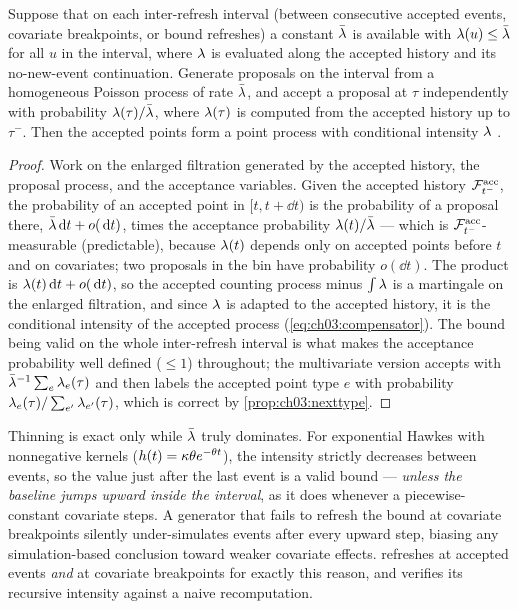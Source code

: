\begin{proposition}\label{prop:ch03:thinning}
Suppose that on each inter-refresh interval (between consecutive accepted
events, covariate breakpoints, or bound refreshes) a constant
$\bar{\lambda}$ is available with $\lambda(u) \le \bar{\lambda}$ for all $u$ in the
interval, where $\lambda$ is evaluated along the accepted history and its
no-new-event continuation. Generate proposals on the interval from a
homogeneous Poisson process of rate $\bar{\lambda}$, and accept a proposal at
$\tau$ independently with probability $\lambda(\tau)/\bar{\lambda}$, where
$\lambda(\tau)$ is computed from the accepted history up to $\tau^-$. Then
the accepted points form a point process with conditional intensity
$\lambda$ \citep{lewisshedler1979,ogata1981}.
\end{proposition}

\begin{proof}
Work on the enlarged filtration generated by the accepted history, the
proposal process, and the acceptance variables. Given the accepted history
$\mathcal{F}^{\mathrm{acc}}_{t^-}$, the probability of an accepted point in
$[t, t+\dd t)$ is the probability of a proposal there,
$\bar{\lambda}\,\mathrm{d} t + o(\,\mathrm{d} t)$, times the acceptance probability
$\lambda(t)/\bar{\lambda}$ --- which is $\mathcal{F}^{\mathrm{acc}}_{t^-}$-measurable
(predictable), because $\lambda(t)$ depends only on accepted points before
$t$ and on covariates; two proposals in the bin have probability
$o(\dd t)$. The product is $\lambda(t)\,\mathrm{d} t + o(\,\mathrm{d} t)$, so the accepted
counting process minus $\int \lambda$ is a martingale on the enlarged
filtration, and since $\lambda$ is adapted to the accepted history, it is
the conditional intensity of the accepted process
(\cref{eq:ch03:compensator}). The bound being valid on the whole
inter-refresh interval is what makes the acceptance probability well
defined ($\le 1$) throughout; the multivariate version accepts with
$\bar{\lambda}^{-1}\sum_e \lambda_e(\tau)$ and then labels the accepted point type
$e$ with probability $\lambda_e(\tau)/\sum_{e'}\lambda_{e'}(\tau)$, which is
correct by \cref{prop:ch03:nexttype}.
\end{proof}

\begin{warning}\label{warn:ch03:bound}
Thinning is exact only while $\bar{\lambda}$ truly dominates. For exponential
Hawkes with nonnegative kernels ($h(t) = \kappa\theta
e^{-\theta t}$), the intensity strictly decreases between events, so the
value just after the last event is a valid bound --- \emph{unless the
baseline jumps upward inside the interval}, as it does whenever a
piecewise-constant covariate steps. A generator that fails to refresh the
bound at covariate breakpoints silently under-simulates events after
every upward step, biasing any simulation-based conclusion toward weaker
covariate effects.  refreshes at
accepted events \emph{and} at covariate breakpoints for exactly this
reason, and verifies its recursive intensity against a naive
recomputation.
\end{warning}

